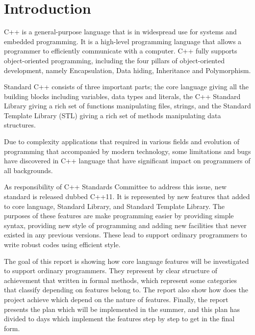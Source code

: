\documentclass[11pt,]{report}
\begin{document}
\section{Introduction}  
\label{section: intorduction}

C++ is a general-purpose language that is in widespread use for systems and embedded programming. It is a high-level programming language that \linebreak allows a programmer to efficiently communicate with a computer. C++ fully \linebreak supports object-oriented programming, including the four pillars of \linebreak object-oriented development, namely Encapsulation, Data hiding, Inheritance and Polymorphism.

Standard C++ consists of three important parts; the core language giving all the building blocks including variables, data types and literals, the C++ Standard Library giving a rich set of functions manipulating files, strings, and the Standard Template Library (STL) giving a rich set of methods manipulating data structures.

Due to complexity applications  that required in various fields and evolution of programming that  accompanied by modern technology, some limitations and bugs have discovered in C++ language that have significant impact on \linebreak programmers of all backgrounds.

As responsibility of C++ Standards Committee to address this issue, new standard is released dubbed C++11. It is represented by new features that added to core language, Standard  Library, and Standard Template Library. The purposes of these features are make programming easier by providing simple syntax, providing new style of programming and adding new facilities that never existed in any previous versions. These lead to support ordinary programmers to write robust codes using efficient style.

The goal of this report is showing how core language features will be \linebreak investigated to support ordinary  programmers. They represent by clear \linebreak structure of achievement that written in formal methods, which represent some categories that  classify depending on features belong to. The report also show how does the project achieve  which depend on the nature of features. Finally, the report presents the plan which will be implemented in the summer, and this plan has divided to days  which implement the features step by step to get in the final form.
\end{document}
